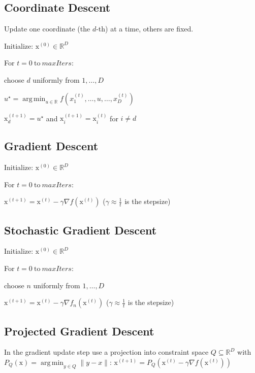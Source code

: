 \documentclass[a4paper, 11pt, landscape]{article}
\newcommand{\matr}[1]{\boldsymbol{\mathrm{#1}}}
\DeclareMathOperator*{\argmin}{arg\,min}
\begin{document}
\begin{multicols*}{3}
\subsection{Coordinate Descent}
Update one coordinate (the $d$-th) at a time, others are fixed.
\begin{compactenum}
	\item Initialize: $\matr{x}^{(0)} \in \mathbb{R}^D$
	\item For $t = 0 \ \text{to} \ \mathit{maxIters}$:
	\item choose $d$ uniformly from $1, \ldots, D$
	\item $u^\star = \argmin_{u \in \mathbb{R}} f(x_1^{(t)}, \ldots, u, \ldots, x_D^{(t)})$
	\item $\matr{x}_d^{(t+1)} = u^\star$ and $\matr{x}_i^{(t+1)} = \matr{x}_i^{(t)}$ for $i \neq d$
\end{compactenum}

\subsection{Gradient Descent}
\begin{compactenum}
	\item Initialize: $\matr{x}^{(0)} \in \mathbb{R}^D$
	\item For $t = 0 \ \text{to} \ \mathit{maxIters}$:
	\item $\matr{x}^{(t+1)} = \matr{x}^{(t)} - \gamma \nabla f(\matr{x}^{(t)})$ ($\gamma \approx \frac{1}{t}$ is the stepsize)
\end{compactenum}

\subsection{Stochastic Gradient Descent}
\begin{compactenum}
	\item Initialize: $\matr{x}^{(0)} \in \mathbb{R}^D$
	\item For $t = 0 \ \text{to} \ \mathit{maxIters}$:
	\item choose $n$ uniformly from $1, \ldots, D$
	\item $\matr{x}^{(t+1)} = \matr{x}^{(t)} - \gamma \nabla f_n(\matr{x}^{(t)})$ ($\gamma \approx \frac{1}{t}$ is the stepsize)
\end{compactenum}

\subsection{Projected Gradient Descent}
In the gradient update step use a projection into constraint space $Q \subseteq \mathbb{R}^D$ with $P_Q(\matr{x}) = \argmin_{y \in Q} \|y - x\|$: $\matr{x}^{(t+1)} = P_Q\left(\matr{x}^{(t)} - \gamma \nabla f(\matr{x}^{(t)})\right)$


\end{multicols*}
\end{document}
